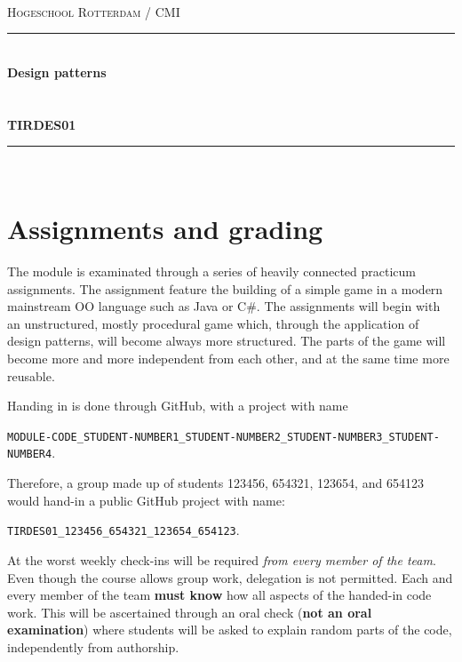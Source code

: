 \documentclass[titlepage,a4paper, 11pt]{article}
\newcommand{\mcode}{TIRDES01}  %
\newcommand{\mname}{Design patterns} %
\newcommand{\HRule}{\rule{\linewidth}{1pt}} %
\begin{document}
\sffamily
\begin{titlepage}

\thispagestyle{fancy}
\ \\
\ \\
\ \\
\begin{center}

  \textsc{\LARGE Hogeschool Rotterdam / CMI}\\[1.5cm]

  \HRule \\[0.4cm]
  { \Huge \bfseries \mname}\\[0.4cm]
  \ \\
  \ \\
  { \large \bfseries \mcode}\\[0.4cm]

  \HRule \\[1.5cm]

  \vfill
\end{center}
\end{titlepage}
\rfoot{\thepage} %
\tableofcontents %
\newpage

\section{Assignments and grading}
The module is examinated through a series of heavily connected practicum assignments. The assignment feature the building of a simple game in a modern mainstream OO language such as Java or C\#. The assignments will begin with an unstructured, mostly procedural game which, through the application of design patterns, will become always more structured. The parts of the game will become more and more independent from each other, and at the same time more reusable.

Handing in is done through GitHub, with a project with name 

\texttt{MODULE-CODE\_STUDENT-NUMBER1\_STUDENT-NUMBER2\_STUDENT-NUMBER3\_STUDENT-NUMBER4}. 

Therefore, a group made up of students 123456, 654321, 123654, and 654123 would hand-in a public GitHub project with name:

\texttt{TIRDES01\_123456\_654321\_123654\_654123}.

At the worst weekly check-ins will be required \textit{from every member of the team}. Even though the course allows group work, delegation is not permitted. Each and every member of the team \textbf{must know} how all aspects of the handed-in code work. This will be ascertained through an oral check (\textbf{not an oral examination}) where students will be asked to explain random parts of the code, independently from authorship.
\end{document}
